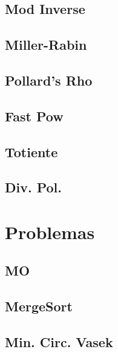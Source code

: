 \documentclass[12pt, a4paper, twoside]{article}
\begin{document}
\subsection{Mod Inverse}


\subsection{Miller-Rabin}


\subsection{Pollard's Rho}


\subsection{Fast Pow}


\subsection{Totiente}


\subsection{Div. Pol.}




%
%

\section{Problemas}

\subsection{MO}


\subsection{MergeSort}


\subsection{Min. Circ. Vasek}

\end{document}
